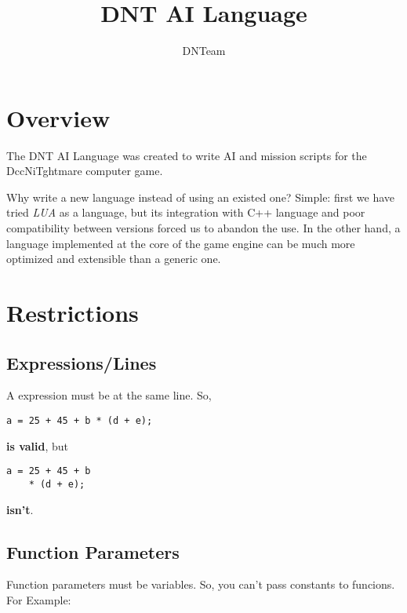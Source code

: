 \documentclass[ letterpaper,12pt]{article}
\begin{document}
\title{\textbf{DNT AI Language}}

\author
{
DNTeam
}

\maketitle

\newpage

\tableofcontents

\newpage

\section{Overview}

   The DNT AI Language was created to write AI and mission scripts for the
DccNiTghtmare computer game. 

   Why write a new language instead of using an existed one? Simple: first we
have tried {\it LUA} as a language, but its integration with C++ language and poor
compatibility between versions forced us to abandon the use. In the other hand,
a language implemented at the core of the game engine can be much more optimized
and extensible than a generic one.

\section{Restrictions}

\subsection{Expressions/Lines}
A expression must be at the same line. So,

\begin{verbatim}
a = 25 + 45 + b * (d + e);
\end{verbatim}

{\bf is valid}, but

\begin{verbatim}
a = 25 + 45 + b 
    * (d + e);
\end{verbatim}

{\bf isn't}.

\subsection{Function Parameters}

Function parameters must be variables. So, you can't pass constants to funcions.
For Example:
\end{document}
